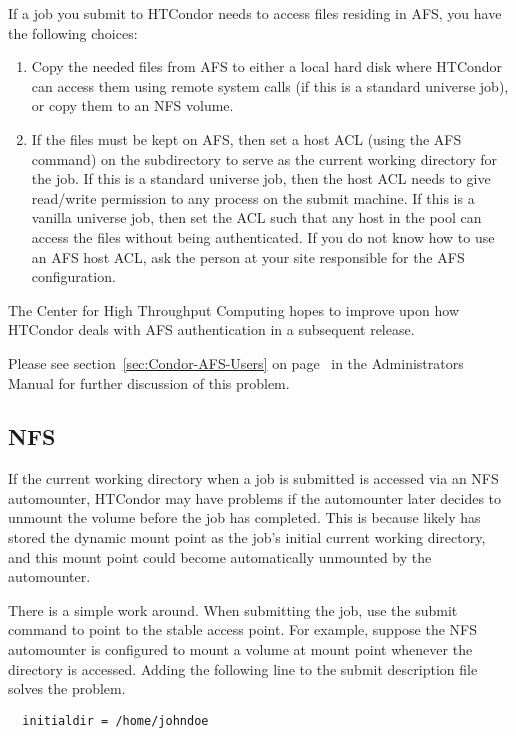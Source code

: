 If a job you submit to HTCondor needs to access files residing in AFS,
you have the following choices:
\begin{enumerate}
\item Copy the needed files from AFS to either a local hard disk where 
HTCondor can access them using remote system calls (if
this is a standard universe job), or copy them to an NFS volume.
\item If the files must be kept on AFS, then set a host ACL
(using the AFS  command) on the subdirectory to
serve as the current working directory for the job.
If this is a standard universe job, then the host ACL needs
to give read/write permission to any process on the submit machine.
If this is a vanilla universe job, then set the ACL such that any host 
in the pool can access the files without being authenticated.
If you do not know how to use an AFS host ACL, ask the person at your 
site responsible for the AFS configuration.
\end{enumerate}

The Center for High Throughput Computing hopes to improve upon how 
HTCondor deals with AFS 
authentication in a subsequent release.

Please see section~\ref{sec:Condor-AFS-Users} on
page~\pageref{sec:Condor-AFS-Users} in the Administrators Manual for
further discussion of this problem.

\subsection{NFS}

If the current working directory when a job is submitted
is accessed via an NFS automounter, HTCondor may have problems if the
automounter later decides to unmount the volume before the job has
completed.
This is because  likely has stored the
dynamic mount point as the job's initial current working directory, and
this mount point could become automatically unmounted by the
automounter.

There is a simple work around.
When submitting the job,
use the submit command  to point to
the stable access point.
For example,
suppose the NFS automounter is configured to mount a volume at mount point
whenever the directory  is accessed.
Adding the following line to the
submit description file solves the problem.
\begin{verbatim}
  initialdir = /home/johndoe
\end{verbatim}

